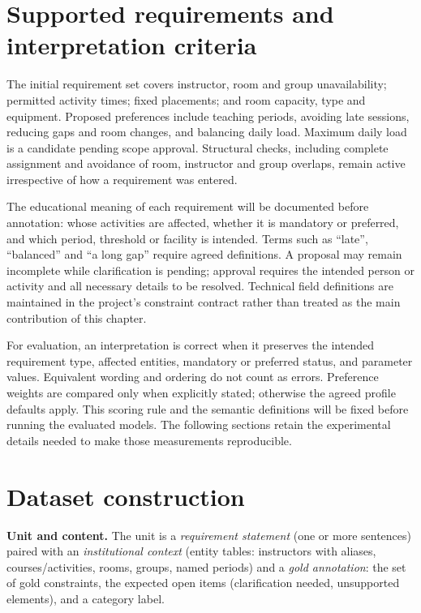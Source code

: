 \documentclass[
  11pt,a4paper,oneside]{report}
\begin{document}
\section{Supported requirements and interpretation criteria}\label{formal-representation-of-supported-constraints}
The initial requirement set covers instructor, room and group unavailability; permitted activity times; fixed placements; and room capacity, type and equipment. Proposed preferences include teaching periods, avoiding late sessions, reducing gaps and room changes, and balancing daily load. Maximum daily load is a candidate pending scope approval. Structural checks, including complete assignment and avoidance of room, instructor and group overlaps, remain active irrespective of how a requirement was entered.

The educational meaning of each requirement will be documented before annotation: whose activities are affected, whether it is mandatory or preferred, and which period, threshold or facility is intended. Terms such as ``late'', ``balanced'' and ``a long gap'' require agreed definitions. A proposal may remain incomplete while clarification is pending; approval requires the intended person or activity and all necessary details to be resolved. Technical field definitions are maintained in the project's constraint contract rather than treated as the main contribution of this chapter.

For evaluation, an interpretation is correct when it preserves the intended requirement type, affected entities, mandatory or preferred status, and parameter values. Equivalent wording and ordering do not count as errors. Preference weights are compared only when explicitly stated; otherwise the agreed profile defaults apply. This scoring rule and the semantic definitions will be fixed before running the evaluated models. The following sections retain the experimental details needed to make those measurements reproducible.

\hypertarget{dataset-construction}{%
\section{Dataset construction}\label{dataset-construction}}

\textbf{Unit and content.} The unit is a \emph{requirement statement}
(one or more sentences) paired with an \emph{institutional context}
(entity tables: instructors with aliases, courses/activities, rooms,
groups, named periods) and a \emph{gold annotation}: the set of gold
constraints, the expected open items (clarification needed, unsupported
elements), and a category label.
\end{document}
